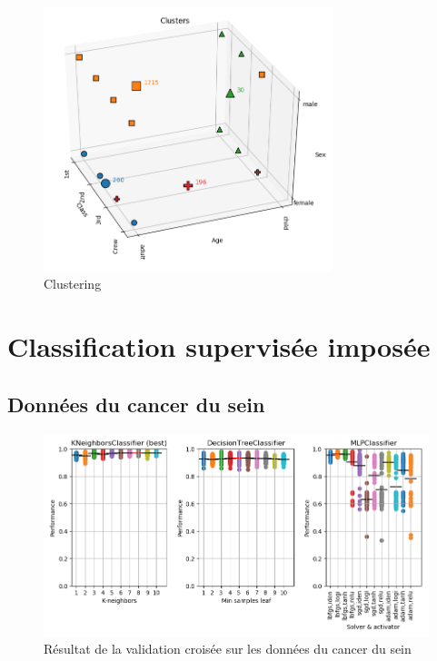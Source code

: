 \documentclass{beamer}
\begin{document}
\begin{frame}[plain]
    \begin{figure}[H]
        \begin{center}
            \includegraphics[width=0.75\textwidth]{ex1_clusters}
        \end{center}
        \caption{Clustering}
        \label{Clustering}
    \end{figure}
\end{frame}

\section{Classification supervisée imposée}

\subsection{Données du cancer du sein}

\begin{frame}[plain]
    \begin{figure}[H]
        \begin{center}
            \includegraphics[width=1\textwidth]{ex2_breastcancer}
        \end{center}
        \caption{Résultat de la validation croisée sur les données du cancer du sein}
        \label{Résultat de la validation croisée sur les données du cancer du sein}
    \end{figure}
\end{frame}
\end{document}

